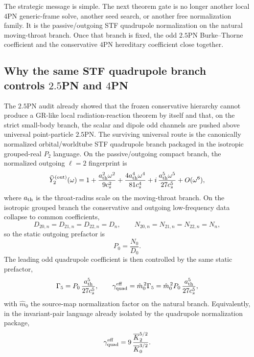 \documentclass[11pt]{article}
\begin{document}
The strategic message is simple.  The next theorem gate is no longer another
local $4$PN generic-frame solve, another seed search, or another free
normalization family.  It is the passive/outgoing STF quadrupole normalization
on the natural moving-throat branch.  Once that branch is fixed, the odd
$2.5$PN Burke--Thorne coefficient and the conservative $4$PN hereditary
coefficient close together.

\subsection{Why the same STF quadrupole branch controls \texorpdfstring{$2.5$}{2.5}PN and \texorpdfstring{$4$}{4}PN}
\label{sec:interface-same-branch}

The $2.5$PN audit already showed that the frozen conservative hierarchy cannot
produce a GR-like local radiation-reaction theorem by itself and that, on the
strict small-body branch, the scalar and dipole odd channels are pushed above
universal point-particle $2.5$PN.  The surviving universal route is the
canonically normalized orbital/worldtube STF quadrupole branch packaged in the
isotropic grouped-real $P_2$ language.  On the passive/outgoing compact branch,
the normalized outgoing $\ell=2$ fingerprint is
\begin{equation}
\widehat Y_2^{\rm(out)}(\omega)
=
1+\frac{a_{\rm th}^2\omega^2}{9c_s^2}
+\frac{4a_{\rm th}^4\omega^4}{81c_s^4}
+i\,\frac{a_{\rm th}^5\omega^5}{27c_s^5}
+O(\omega^6),
\label{eq:interface-outgoing-l2-fingerprint}
\end{equation}
where $a_{\rm th}$ is the throat-radius scale on the moving-throat branch.  On
the isotropic grouped branch the conservative and outgoing low-frequency data
collapse to common coefficients,
\begin{equation}
D_{20,n}=D_{21,n}=D_{22,n}=D_n,
\qquad
N_{20,n}=N_{21,n}=N_{22,n}=N_n,
\label{eq:interface-grouped-collapse}
\end{equation}
so the static outgoing prefactor is
\begin{equation}
P_0=\frac{N_0}{D_0}.
\label{eq:interface-P0}
\end{equation}
The leading odd quadrupole coefficient is then controlled by the same static
prefactor,
\begin{equation}
\Gamma_5
=
P_0\,\frac{a_{\rm th}^5}{27c_s^5},
\qquad
\gamma_{\rm quad}^{\rm eff}
=
\hat m_0^{\,2}\Gamma_5
=
\hat m_0^{\,2}P_0\,\frac{a_{\rm th}^5}{27c_s^5},
\label{eq:interface-gamma-from-P0}
\end{equation}
with $\hat m_0$ the source-map normalization factor on the natural branch.
Equivalently, in the invariant-pair language already isolated by the quadrupole
normalization package,
\begin{equation}
\gamma_{\rm quad}^{\rm eff}
=
9\,\frac{\overline K_2^{5/2}}{\overline K_0^{3/2}}.
\label{eq:interface-gamma-invariant-pair}
\end{equation}
\end{document}
